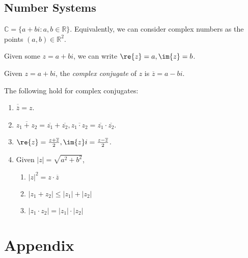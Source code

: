 \documentclass[12pt,oneside]{article}
\begin{document}
\subsection{Number Systems}
\begin{definition}
  $\mathbb{C} = \{a + bi : a, b \in \mathbb{R}\}$. Equivalently, we can consider complex numbers as the points $(a,b) \in \mathbb{R}^2$.\footnotemark

  Given some $z = a + bi$, we can write $\re{z} = a, \im{z} =b$.
\end{definition}

\begin{definition}
  Given $z = a + bi$, the \emph{complex conjugate} of $z$ is $\overline{z} = a - bi$.
\end{definition}

\begin{lemma}
  The following hold for complex conjugates:\footnotemark

  \begin{enumerate}[label=(\alph*)]
    \item $\overline{\overline{z}} = z$.
    \item $\overline{z_1 + z_2} = \overline{z_1} + \overline{z_2}, \overline{z_1 \cdot z_2} = \overline{z_1} \cdot \overline{z_2}$.
    \item $\re{z} = \frac{z+\overline{z}}{2}, \im{z}i = \frac{z-\overline{z}}{2}$.
    \item Given $|z| = \sqrt{a^2+b^2}$, 
    \begin{enumerate}[label=(\roman*)]
      \item $|z|^2 = z \cdot \overline{z}$
      \item $|z_1 + z_2|\leq |z_1| + |z_2|$
      \item $|z_1\cdot z_2| = |z_1| \cdot |z_2|$
    \end{enumerate}
  \end{enumerate}
\end{lemma}


\section{Appendix}
\end{document}
